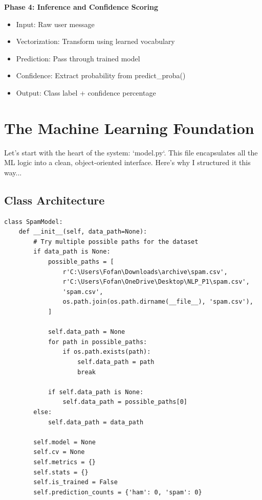 \documentclass[12pt, a4paper]{article}
\begin{document}
\textbf{Phase 4: Inference and Confidence Scoring}

\begin{itemize}
    \item Input: Raw user message
    \item Vectorization: Transform using learned vocabulary
    \item Prediction: Pass through trained model
    \item Confidence: Extract probability from predict\_proba()
    \item Output: Class label + confidence percentage
\end{itemize}

\section{The Machine Learning Foundation}

Let's start with the heart of the system: `model.py`. This file encapsulates all the ML logic into a clean, object-oriented interface. Here's why I structured it this way...

\subsection{Class Architecture}

\begin{verbatim}
class SpamModel:
    def __init__(self, data_path=None):
        # Try multiple possible paths for the dataset
        if data_path is None:
            possible_paths = [
                r'C:\Users\Fofan\Downloads\archive\spam.csv',
                r'C:\Users\Fofan\OneDrive\Desktop\NLP_P1\spam.csv',
                'spam.csv',
                os.path.join(os.path.dirname(__file__), 'spam.csv'),
            ]
            
            self.data_path = None
            for path in possible_paths:
                if os.path.exists(path):
                    self.data_path = path
                    break
            
            if self.data_path is None:
                self.data_path = possible_paths[0]
        else:
            self.data_path = data_path
            
        self.model = None
        self.cv = None
        self.metrics = {}
        self.stats = {}
        self.is_trained = False
        self.prediction_counts = {'ham': 0, 'spam': 0}
\end{verbatim}
\end{document}
